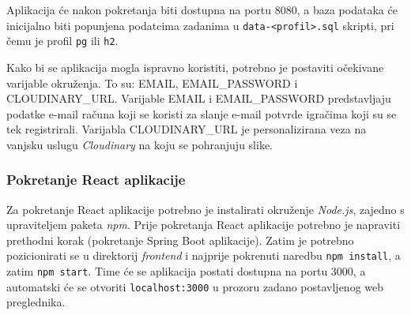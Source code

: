 			{Aplikacija će nakon pokretanja biti dostupna na portu 8080, a baza podataka će inicijalno biti popunjena podatcima zadanima u \texttt{data-<profil>.sql} skripti, pri čemu je profil \texttt{pg} ili \texttt{h2}.}
			
			{Kako bi se aplikacija mogla ispravno koristiti, potrebno je postaviti očekivane varijable okruženja. To su: EMAIL, EMAIL\_PASSWORD i CLOUDINARY\_URL. Varijable EMAIL i EMAIL\_PASSWORD predstavljaju podatke e-mail računa koji se koristi za slanje e-mail potvrde igračima koji su se tek registrirali. Varijabla CLOUDINARY\_URL je personalizirana veza na vanjsku uslugu \textit{Cloudinary} na koju se pohranjuju slike.}
			
 			\subsubsection{Pokretanje React aplikacije}
			
			{Za pokretanje React aplikacije potrebno je instalirati okruženje \textit{Node.js}, zajedno s upraviteljem paketa \textit{npm}. Prije pokretanja React aplikacije potrebno je napraviti prethodni korak (pokretanje Spring Boot aplikacije). Zatim je potrebno pozicionirati se u direktorij \textit{frontend} i najprije pokrenuti naredbu \texttt{npm install}, a zatim \texttt{npm start}. Time će se aplikacija postati dostupna na portu 3000, a automatski će se otvoriti \texttt{localhost:3000} u prozoru zadano postavljenog web preglednika.}
			
			\eject 